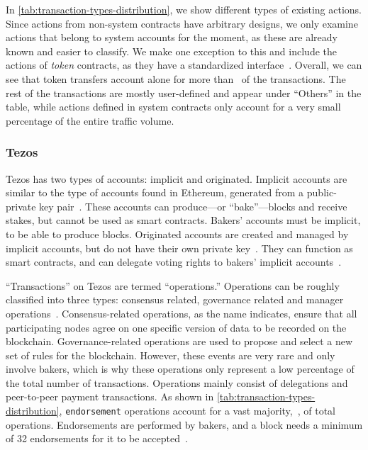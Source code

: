 In \autoref{tab:transaction-types-distribution}, we show different types of existing actions. 
Since actions from non-system contracts have arbitrary designs, we only examine actions that belong to system accounts for the moment, as these are already known and easier to classify. We make one exception to this and include the actions of \emph{token} contracts, as they have a standardized interface~\cite{eosio-tokens}.
Overall, we can see that token transfers account alone for more than~ of the transactions. The rest of the transactions are mostly user-defined and appear under ``Others'' in the table, while actions defined in system contracts only account for a very small percentage of the entire traffic volume.



\subsubsection{Tezos}
Tezos has two types of accounts: implicit and originated.
Implicit accounts are similar to the type of accounts found in Ethereum, generated from a public-private key pair~\cite{Wood2014}.
These accounts can produce---or ``bake''---blocks and receive stakes, but cannot be used as smart contracts.
Bakers' accounts must be implicit, to be able to produce blocks.
Originated accounts are created and managed by implicit accounts, but do not have their own private key~\cite{NomadicLabs2018a}. 
They can function as smart contracts, and can delegate voting rights to bakers' implicit accounts~\cite{Labs2018}.

``Transactions'' on Tezos are termed  ``operations.''
Operations can be roughly classified into three types: consensus related, governance related and manager operations~\cite{AmitPanghal2019}.
Consensus-related operations, as the name indicates, ensure that all participating nodes agree on one specific version of data to be recorded on the blockchain. 
Governance-related operations are used to propose and select a new set of rules for the blockchain. 
However, these events are very rare and only involve bakers, which is why these operations only represent a low percentage of the total number of transactions. 
Operations mainly consist of delegations and peer-to-peer payment transactions. 
As shown in \autoref{tab:transaction-types-distribution}, \texttt{endorsement} operations account for a vast majority,~, of total operations.
Endorsements are performed by bakers, and a block needs a minimum of 32 endorsements for it to be accepted~\cite{NomadicLabs2018b}.


